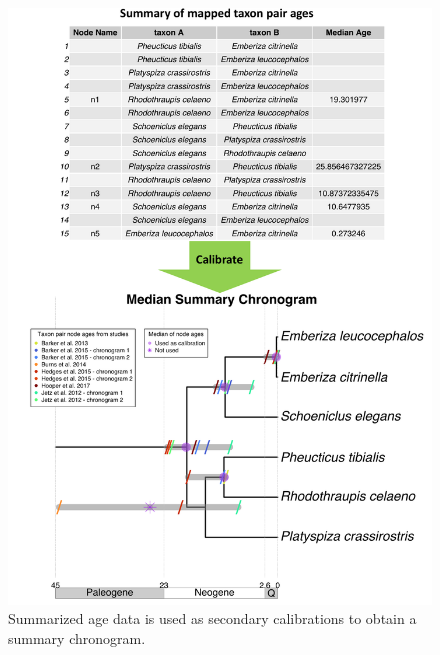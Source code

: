 \newpage
\begin{figure}[!h]
\includegraphics[width=1\linewidth]{../figures/figure2/figure2-2.pdf}
\caption{
Summarized age data is used as secondary calibrations to obtain a summary chronogram.
}
\label{fig:figure2-2}
\end{figure}


